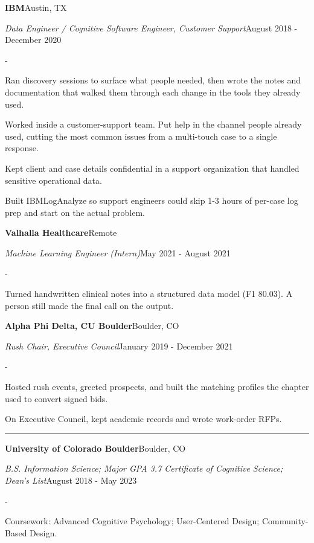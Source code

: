 \documentclass[10pt,letterpaper]{article}
\newenvironment{cvitems}{%
  \begin{list}{-}{%
    \setlength{\leftmargin}{12pt}%
    \setlength{\itemsep}{1.2pt}%
    \setlength{\parsep}{0pt}%
    \setlength{\topsep}{1.5pt}%
    \setlength{\partopsep}{0pt}%
    \setlength{\labelwidth}{6pt}%
    \setlength{\labelsep}{6pt}%
    \setlength{\itemindent}{0pt}%
  }%
}{\end{list}}
\newcommand{\cvsection}[1]{%
  \vspace{7pt}%
  \noindent{\bfseries\fontsize{11pt}{13pt}\selectfont\MakeUppercase{#1}}\par
  \vspace{1pt}%
  \noindent\rule{\textwidth}{0.4pt}\par
  \vspace{4pt}%
}
\newcommand{\cventryhead}[4]{%
  \noindent\textbf{#1}\hfill#2\par
  \vspace{0.5pt}%
  \noindent\textit{#3}\hfill#4\par
}
\newcommand{\cveduhead}[4]{%
  \noindent\textbf{#1}\hfill#2\par
  \vspace{0.5pt}%
  \noindent\textit{#3}\hfill#4\par
}
\begin{document}
\vspace{3pt}
\cventryhead{IBM}{Austin, TX}
{Data Engineer / Cognitive Software Engineer, Customer Support}{August 2018 - December 2020}
\begin{cvitems}
  \item Ran discovery sessions to surface what people needed, then wrote the notes and documentation that walked them through each change in the tools they already used.
  \item Worked inside a customer-support team. Put help in the channel people already used, cutting the most common issues from a multi-touch case to a single response.
  \item Kept client and case details confidential in a support organization that handled sensitive operational data.
  \item Built IBMLogAnalyze so support engineers could skip 1-3 hours of per-case log prep and start on the actual problem.
\end{cvitems}

\vspace{3pt}
\cventryhead{Valhalla Healthcare}{Remote}{Machine Learning Engineer (Intern)}{May 2021 - August 2021}
\begin{cvitems}
  \item Turned handwritten clinical notes into a structured data model (F1 80.03). A person still made the final call on the output.
\end{cvitems}

\vspace{3pt}
\cventryhead{Alpha Phi Delta, CU Boulder}{Boulder, CO}{Rush Chair, Executive Council}{January 2019 - December 2021}
\begin{cvitems}
  \item Hosted rush events, greeted prospects, and built the matching profiles the chapter used to convert signed bids.
  \item On Executive Council, kept academic records and wrote work-order RFPs.
\end{cvitems}

\cvsection{Education}

\cveduhead{University of Colorado Boulder}{Boulder, CO}
{B.S. Information Science; Major GPA 3.7 \textbar{} Certificate of Cognitive Science; Dean's List}{August 2018 - May 2023}
\begin{cvitems}
  \item Coursework: Advanced Cognitive Psychology; User-Centered Design; Community-Based Design.
\end{cvitems}
\end{document}
